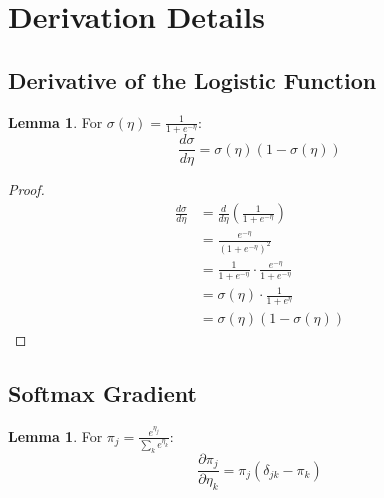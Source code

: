 \documentclass[11pt,letterpaper]{article}
\theoremstyle{definition}
\newtheorem{lemma}[theorem]{Lemma}
\begin{document}
\appendix
\section{Derivation Details}

\subsection{Derivative of the Logistic Function}

\begin{lemma}
For $\sigma(\eta) = \frac{1}{1+e^{-\eta}}$:
\begin{equation}
    \frac{d\sigma}{d\eta} = \sigma(\eta)(1-\sigma(\eta))
\end{equation}
\end{lemma}

\begin{proof}
\begin{align}
    \frac{d\sigma}{d\eta} &= \frac{d}{d\eta}\left(\frac{1}{1+e^{-\eta}}\right) \\
    &= \frac{e^{-\eta}}{(1+e^{-\eta})^2} \\
    &= \frac{1}{1+e^{-\eta}} \cdot \frac{e^{-\eta}}{1+e^{-\eta}} \\
    &= \sigma(\eta) \cdot \frac{1}{1+e^\eta} \\
    &= \sigma(\eta)(1-\sigma(\eta))
\end{align}
\end{proof}

\subsection{Softmax Gradient}

\begin{lemma}
For $\pi_j = \frac{e^{\eta_j}}{\sum_k e^{\eta_k}}$:
\begin{equation}
    \frac{\partial \pi_j}{\partial \eta_k} = \pi_j(\delta_{jk} - \pi_k)
\end{equation}
\end{lemma}
\end{document}
